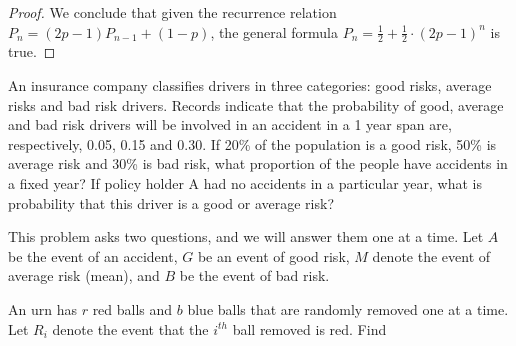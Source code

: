 \documentclass{exam}
\begin{document}
\begin{questions}
\begin{proof}
    We conclude that given the recurrence relation $P_n = (2p - 1)P_{n - 1} + (1 - p)$, the general formula $P_n = \frac{1}{2} + \frac{1}{2} \cdot (2p - 1)^n$ is true.
\end{proof}



\newpage
\question
An insurance company classifies drivers in three categories: good risks, average
risks and bad risk drivers. Records indicate that the probability of good, average and bad risk drivers will be involved in an accident in a 1 year span are, respectively, 0.05, 0.15 and 0.30. If 20\% of the population is a good risk, 50\% is average risk and 30\% is bad risk, what proportion of the people have accidents in a fixed year? If policy holder A had no accidents in a particular year, what is probability that this driver is a good or average risk?

\sol
This problem asks two questions, and we will answer them one at a time. Let $A$ be the event of an accident, $G$ be an event of good risk, $M$ denote the event of average risk (mean), and $B$ be the event of bad risk.




\newpage
\question
An urn has $r$ red balls and $b$ blue balls that are randomly removed one at a time. Let $R_i$ denote the event that the $i^{th}$ ball removed is red. Find


\end{questions}
\end{document}
